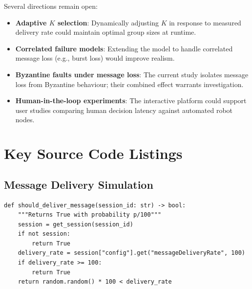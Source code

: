 \documentclass[
12pt,
oneside,
singlespacing,
parskip,
]{article}
\begin{document}
Several directions remain open:
\begin{itemize}
  \item \textbf{Adaptive $K$ selection}: Dynamically adjusting $K$ in response to measured delivery rate could maintain optimal group sizes at runtime.
  \item \textbf{Correlated failure models}: Extending the model to handle correlated message loss (e.g., burst loss) would improve realism.
  \item \textbf{Byzantine faults under message loss}: The current study isolates message loss from Byzantine behaviour; their combined effect warrants investigation.
  \item \textbf{Human-in-the-loop experiments}: The interactive platform could support user studies comparing human decision latency against automated robot nodes.
\end{itemize}






\appendix

\section{Key Source Code Listings}
\label{app:code}

\subsection{Message Delivery Simulation}

\begin{lstlisting}[caption={Bernoulli message loss (\texttt{state.py})}, label=lst:deliver]
def should_deliver_message(session_id: str) -> bool:
    """Returns True with probability p/100"""
    session = get_session(session_id)
    if not session:
        return True
    delivery_rate = session["config"].get("messageDeliveryRate", 100)
    if delivery_rate >= 100:
        return True
    return random.random() * 100 < delivery_rate
\end{lstlisting}
\end{document}
